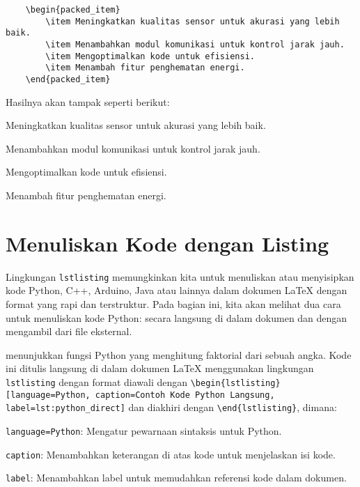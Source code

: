 \begin{lstlisting}
    \begin{packed_item}
        \item Meningkatkan kualitas sensor untuk akurasi yang lebih baik.
        \item Menambahkan modul komunikasi untuk kontrol jarak jauh.
        \item Mengoptimalkan kode untuk efisiensi.
        \item Menambah fitur penghematan energi.
    \end{packed_item}
\end{lstlisting}

Hasilnya akan tampak seperti berikut:
\begin{packed_item}
    \item Meningkatkan kualitas sensor untuk akurasi yang lebih baik.
    \item Menambahkan modul komunikasi untuk kontrol jarak jauh.
    \item Mengoptimalkan kode untuk efisiensi.
    \item Menambah fitur penghematan energi.
\end{packed_item}

\section{Menuliskan Kode dengan Listing}
Lingkungan \texttt{lstlisting} memungkinkan kita untuk menuliskan atau menyisipkan kode Python, C++, Arduino, Java atau lainnya dalam dokumen LaTeX dengan format yang rapi dan terstruktur. Pada bagian ini, kita akan melihat dua cara untuk menuliskan kode Python: secara langsung di dalam dokumen dan dengan mengambil dari file eksternal.

 menunjukkan fungsi Python yang menghitung faktorial dari sebuah angka. Kode ini ditulis langsung di dalam dokumen LaTeX menggunakan lingkungan \texttt{lstlisting} dengan format diawali dengan \texttt{\textbackslash begin\{lstlisting\}[language=Python, caption=Contoh Kode Python Langsung, label=lst:python\_direct]} dan diakhiri dengan \texttt{\textbackslash end\{lstlisting\}}, dimana:
\begin{packed_item}
    \item \texttt{language=Python}: Mengatur pewarnaan sintaksis untuk Python.
    \item \texttt{caption}: Menambahkan keterangan di atas kode untuk menjelaskan isi kode.
    \item \texttt{label}: Menambahkan label untuk memudahkan referensi kode dalam dokumen.
\end{packed_item}

